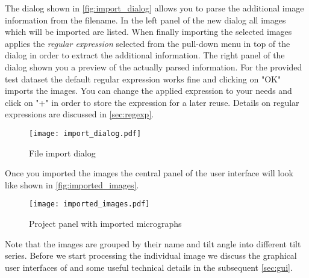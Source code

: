 The dialog shown in \autoref{fig:import_dialog} allows you to parse the additional image information from the filename. In the left panel of the new dialog all images which will be imported are listed. When finally importing the selected images {\twodx} applies the \textit{regular expression}  selected from the pull-down menu in top of the dialog in order to extract the additional information. The right panel of the dialog shown you a preview of the actually parsed information. For the provided test dataset the default regular expression works fine and clicking on "OK" imports the images. You can change the applied expression to your needs and click on "+" in order to store the expression for a later reuse. Details on regular expressions are discussed in \autoref{sec:regexp}.

\begin{figure}[H]
	\centering
	\texttt{[image: import\_dialog.pdf]}
	\caption{File import dialog}
	\label{fig:import_dialog}
\end{figure}

Once you imported the images the central panel of the {\twodx} user interface will look like shown in \autoref{fig:imported_images}. 

\begin{figure}[H]
	\centering
	\texttt{[image: imported\_images.pdf]}
	\caption{Project panel with imported micrographs}
	\label{fig:imported_images}
\end{figure}

Note that the images are grouped by their name and tilt angle into different tilt series. Before we start processing the individual image we discuss the graphical user interfaces of {\twodx} and some useful technical details in the subsequent \autoref{sec:gui}.

